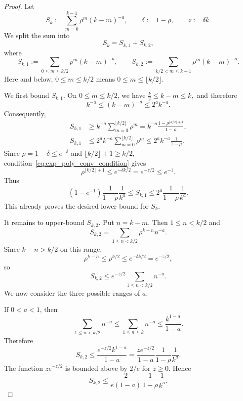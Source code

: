 \begin{proof}
Let
\[
    S_k:=\sum_{m=0}^{k-1}\rho^m(k-m)^{-a},
    \qquad
    \delta:=1-\rho,
    \qquad
    z:=\delta k.
\]
We split the sum into
\[
    S_k=S_{k,1}+S_{k,2},
\]
where
\[
    S_{k,1}:=\sum_{0\le m\le k/2}\rho^m(k-m)^{-a},
    \qquad
    S_{k,2}:=\sum_{k/2<m\le k-1}\rho^m(k-m)^{-a}.
\]
Here and below, $0\le m\le k/2$ means $0\le m\le \lfloor k/2\rfloor$.

We first bound $S_{k,1}$. On $0\le m\le k/2$, we have $\frac{k}{2}\le k-m\le k,$
and therefore
\[
    k^{-a}\le (k-m)^{-a}\le 2^a k^{-a}.
\]
Consequently,
\begin{align*}
    S_{k,1}
    &\ge
    k^{-a}\sum_{m=0}^{\lfloor k/2\rfloor}\rho^m
    =
    k^{-a}\frac{1-\rho^{\lfloor k/2\rfloor+1}}{1-\rho},\\
    S_{k,1}
    &\le
    2^a k^{-a}\sum_{m=0}^{\lfloor k/2\rfloor}\rho^m
    \le
    2^a k^{-a}\frac{1}{1-\rho}.
\end{align*}
Since $\rho=1-\delta\le e^{-\delta}$ and $\lfloor k/2\rfloor+1\ge k/2$, condition~\eqref{eq:exp_poly_conv_condition} gives
\[
    \rho^{\lfloor k/2\rfloor+1}
    \le
    e^{-\delta k/2}
    =e^{-z/2}
    \le e^{-1}.
\]
Thus
\begin{equation}
\label{eq:St1_bounds_explicit}
    (1-e^{-1})\frac{1}{1-\rho}\frac{1}{k^a}
    \le
    S_{k,1}
    \le
    2^a\frac{1}{1-\rho}\frac{1}{k^a}.
\end{equation}
This already proves the desired lower bound for $S_k$.

It remains to upper-bound $S_{k,2}$. Put $n=k-m$. Then $1\le n<k/2$ and
\[
    S_{k,2}
    =
    \sum_{1\le n<k/2}\rho^{k-n}n^{-a}.
\]
Since $k-n>k/2$ on this range,
\[
    \rho^{k-n}\le \rho^{k/2}\le e^{-\delta k/2}=e^{-z/2},
\]
so
\begin{equation*}
    S_{k,2}
    \le
    e^{-z/2}\sum_{1\le n<k/2}n^{-a}.
\end{equation*}
We now consider the three possible ranges of $a$.

If $0<a<1$, then
\[
    \sum_{1\le n<k/2}n^{-a}\le \sum_{1\le n\le k}n^{-a}\le \frac{k^{1-a}}{1-a}.
\]
Therefore
\[
    S_{k,2}
    \le
    \frac{e^{-z/2}k^{1-a}}{1-a}
    =
    \frac{z e^{-z/2}}{1-a}\frac{1}{1-\rho}\frac{1}{k^a}.
\]
The function $z e^{-z/2}$ is bounded above by $2/e$ for $z\ge0$. Hence
\begin{equation}
\label{eq:St2_bound_a_less_1}
    S_{k,2}
    \le
    \frac{2}{e(1-a)}\frac{1}{1-\rho}\frac{1}{k^a}.
\end{equation}


\end{proof}
